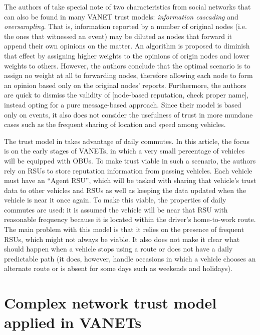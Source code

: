 \documentclass{article}
\begin{document}
The authors of \cite{huang2014social} take special note of two characteristics from social networks that can also be found in many VANET trust models: \textit{information cascading} and \textit{oversampling}.
That is, information reported by a number of original nodes (i.e. the ones that witnessed an event) may be diluted as nodes that forward it append their own opinions on the matter.
An algorithm is proposed to diminish that effect by assigning higher weights to the opinions of origin nodes and lower weights  to others.
However, the authors conclude that the optimal scenario is to assign no weight at all to forwarding nodes, therefore allowing each node to form an opinion based only on the original nodes' reports.
Furthermore, the authors are quick to dismiss the validity of [node-based reputation, check proper name], instead opting for a pure message-based approach.
Since their model is based only on events, it also does not consider the usefulness of trust in more mundane cases such as the frequent sharing of location and speed among vehicles.

The trust model in \cite{park2011long} takes advantage of daily commutes.
In this article, the focus is on the early stages of VANETs, in which a very small percentage of vehicles will be equipped with OBUs.
To make trust viable in such a scenario, the authors rely on RSUs to store reputation information from passing vehicles.
Each vehicle must have an ``Agent RSU'', which will be tasked with sharing that vehicle's trust data to other vehicles and RSUs as well as keeping the data updated when the vehicle is near it once again.
To make this viable, the properties of daily commutes are used: it is assumed the vehicle will be near that RSU with reasonable frequency because it is located within the driver's home-to-work route.
The main problem with this model is that it relies on the presence of frequent RSUs, which might not always be viable.
It also does not make it clear what should happen when a vehicle stops using a route or does not have a daily predictable path (it does, however, handle occasions in which a vehicle chooses an alternate route or is absent for some days such as weekends and holidays).


\section{Complex network trust model applied in VANETs}
\end{document}
